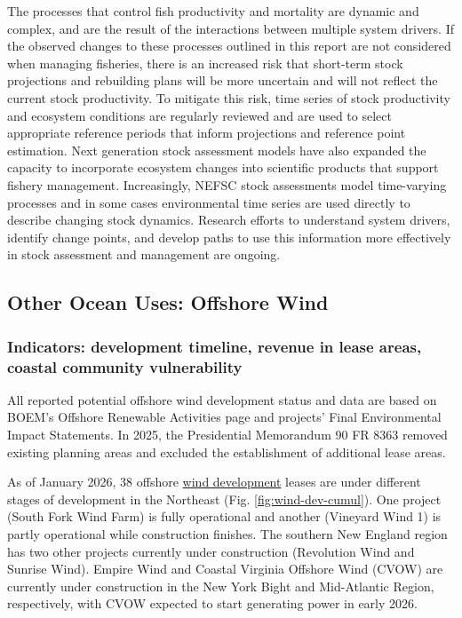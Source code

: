 \documentclass[
  10pt,
]{article}
\begin{document}
The processes that control fish productivity and mortality are dynamic and complex, and are the result of the interactions between multiple system drivers. If the observed changes to these processes outlined in this report are not considered when managing fisheries, there is an increased risk that short-term stock projections and rebuilding plans will be more uncertain and will not reflect the current stock productivity. To mitigate this risk, time series of stock productivity and ecosystem conditions are regularly reviewed and are used to select appropriate reference periods that inform projections and reference point estimation. Next generation stock assessment models have also expanded the capacity to incorporate ecosystem changes into scientific products that support fishery management. Increasingly, NEFSC stock assessments model time-varying processes and in some cases environmental time series are used directly to describe changing stock dynamics. Research efforts to understand system drivers, identify change points, and develop paths to use this information more effectively in stock assessment and management are ongoing.

\subsection{Other Ocean Uses: Offshore Wind}\label{other-ocean-uses-offshore-wind}

\subsubsection{Indicators: development timeline, revenue in lease areas, coastal community vulnerability}\label{indicators-development-timeline-revenue-in-lease-areas-coastal-community-vulnerability}

All reported potential offshore wind development status and data are based on BOEM's Offshore Renewable Activities page and projects' Final Environmental Impact Statements. In 2025, the Presidential Memorandum 90 FR 8363 removed existing planning areas and excluded the establishment of additional lease areas.

As of January 2026, 38 offshore \href{https://noaa-edab.github.io/catalog/wind_dev_speed.html}{wind development} leases are under different stages of development in the Northeast (Fig. \ref{fig:wind-dev-cumul}). One project (South Fork Wind Farm) is fully operational and another (Vineyard Wind 1) is partly operational while construction finishes. The southern New England region has two other projects currently under construction (Revolution Wind and Sunrise Wind). Empire Wind and Coastal Virginia Offshore Wind (CVOW) are currently under construction in the New York Bight and Mid-Atlantic Region, respectively, with CVOW expected to start generating power in early 2026.
\end{document}
